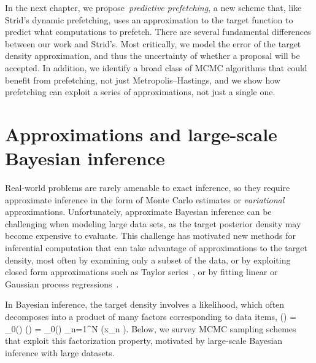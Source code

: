 \documentclass[angelino.tex]{subfiles}
\begin{document}

In the next chapter, we propose~\emph{predictive prefetching},
a new scheme that, like Strid's dynamic prefetching, uses an approximation
to the target function to predict what computations to prefetch.
There are several fundamental differences between our work and Strid's.
Most critically, we model the error of the target density approximation,
and thus the uncertainty of whether a proposal will be accepted.
In addition, we identify a broad class of MCMC algorithms that could benefit
from prefetching, not just Metropolis--Hastings, and we show how prefetching
can exploit a series of approximations, not just a single one.


\section{Approximations and large-scale Bayesian inference}

Real-world problems are rarely amenable to exact inference, so they require 
approximate inference in the form of Monte Carlo estimates or
\emph{variational} approximations.
Unfortunately, approximate Bayesian inference can be challenging when modeling
large data sets, as the target posterior density may become expensive to evaluate.  
This challenge has motivated new methods for inferential computation that can
take advantage of approximations to the target density,
most often by examining only a subset of the data,
or by exploiting closed form approximations
such as Taylor series~\citep{christen-fox-2005-approx},
or by fitting linear or Gaussian process regressions~\citep{conrad:2014-local}.

In Bayesian inference, the target density involves a likelihood, which often 
decomposes into a product of many factors corresponding to data items, \eg
\be
\pi(\theta \given \x) = \pi_0(\theta) \pi(\x \given \theta) 
                 = \pi_0(\theta) \prod_{n=1}^{N} \pi(x_n \given \theta).
\label{bayesian}
\ee
Below, we survey MCMC sampling schemes that exploit this factorization property,
motivated by large-scale Bayesian inference with large datasets.
\end{document}
